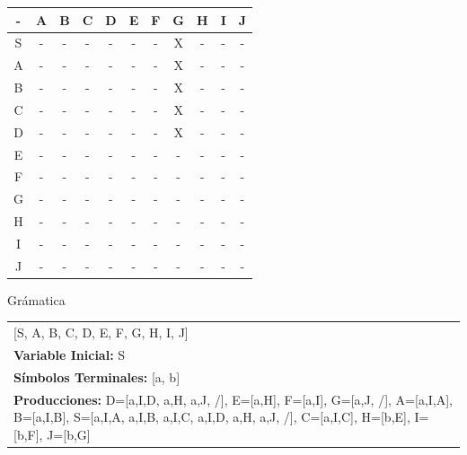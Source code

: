 \documentclass[a4paper,11pt]{article}
\newcommand{\MYp}[1]{ {\color[rgb]{0.392,0.392,0.392}#1} }
\begin{document}
\begin{center}
\begin{tabular}{||c||c||c||c||c||c||c||c||c||c||c||}
\hline
\hline
- & A & B & C & D & E & F & G & H & I & J \\
\hline
\hline
S & - & - & - & - & - & - & X & - & - & - \\
\hline
\hline
A & - & - & - & - & - & - & X & - & - & - \\
\hline
\hline
B & - & - & - & - & - & - & X & - & - & - \\
\hline
\hline
C & - & - & - & - & - & - & X & - & - & - \\
\hline
\hline
D & - & - & - & - & - & - & X & - & - & - \\
\hline
\hline
E & - & - & - & - & - & - & - & - & - & - \\
\hline
\hline
F & - & - & - & - & - & - & - & - & - & - \\
\hline
\hline
G & - & - & - & - & - & - & - & - & - & - \\
\hline
\hline
H & - & - & - & - & - & - & - & - & - & - \\
\hline
\hline
I & - & - & - & - & - & - & - & - & - & - \\
\hline
\hline
J & - & - & - & - & - & - & - & - & - & - \\
\hline
\hline
\end{tabular}
\end{center}

\MYp{\Huge Gr\'amatica}
\newline

\begin{center}\begin{tabular}{ m{15cm} }

\noindent {\bf Variables: }[S, A, B, C, D, E, F, G, H, I, J] \\
{\bf Variable Inicial: }S \\ 
{\bf S\'{i}mbolos Terminales: }[a, b] \\ 
{\bf Producciones: }{D=[a,I,D, a,H, a,J, /], E=[a,H], F=[a,I], G=[a,J, /], A=[a,I,A], B=[a,I,B], S=[a,I,A, a,I,B, a,I,C, a,I,D, a,H, a,J, /], C=[a,I,C], H=[b,E], I=[b,F], J=[b,G]} \\ 
\end{tabular}
\end{center}
\end{document}
